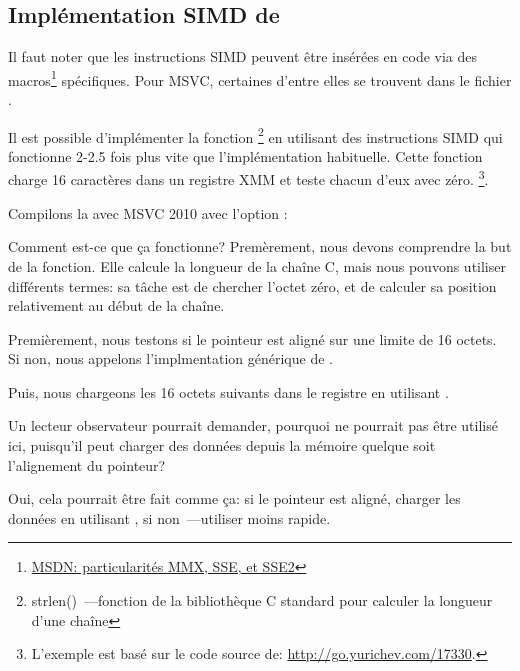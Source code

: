 ﻿\subsection{Implémentation SIMD de \strlen}
\label{SIMD_strlen}

\newcommand{\URLMSDNSSE}{\href{http://go.yurichev.com/17262}{MSDN: particularités MMX, SSE, et SSE2}}

Il faut noter que les instructions \ac{SIMD} peuvent être insérées en code \CCpp via
des macros\footnote{\URLMSDNSSE} spécifiques.
Pour MSVC, certaines d'entre elles se trouvent dans le fichier .

\newcommand{\URLSTRLEN}{http://go.yurichev.com/17330}


Il est possible d'implémenter la fonction \strlen\footnote{strlen()~---fonction de
la bibliothèque C standard pour calculer la longueur d'une chaîne} en utilisant des
instructions SIMD qui fonctionne 2-2.5 fois plus vite que l'implémentation habituelle.
Cette fonction charge 16 caractères dans un registre XMM et teste chacun d'eux avec
zéro.
\footnote{L'exemple est basé sur le code source de: \url{\URLSTRLEN}.}.



Compilons la avec MSVC 2010 avec l'option \Ox:



Comment est-ce que ça fonctionne?
Premèrement, nous devons comprendre la but de la fonction.
Elle calcule la longueur de la chaîne C, mais nous pouvons utiliser différents termes:
sa tâche est de chercher l'octet zéro, et de calculer sa position relativement au
début de la chaîne.

Premièrement, nous testons si le pointeur  est aligné sur une limite de
16 octets.
Si non, nous appelons l'implmentation générique de \strlen.

Puis, nous chargeons les 16 octets suivants dans le registre  en utilisant
\MOVDQA.

Un lecteur observateur pourrait demander, pourquoi \MOVDQU ne pourrait pas être utilisé
ici, puisqu'il peut charger des données depuis la mémoire quelque soit l'alignement
du pointeur?

Oui, cela pourrait être fait comme ça: si le pointeur est aligné, charger les données
en utilisant \MOVDQA, si non~---utiliser \MOVDQU moins rapide.

